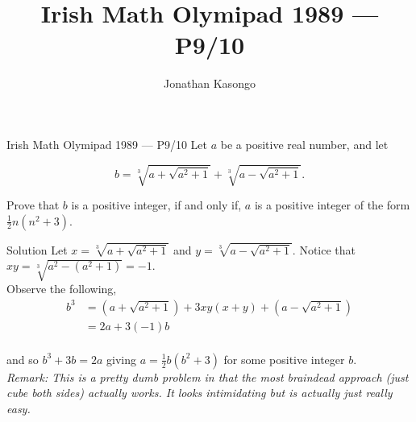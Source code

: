 \documentclass{article}
\author{Jonathan Kasongo}
\title{Irish Math Olymipad 1989 --- P9/10}
\begin{document}
\maketitle

\begin{problem}{Irish Math Olymipad 1989 --- P9/10}
Let $a$ be a positive real number, and let

$$
b = \sqrt[3]{a + \sqrt{a^2 + 1}} + \sqrt[3]{a - \sqrt{a^2 + 1}}.
$$

Prove that $b$ is a positive integer, if and only if, $a$ is a positive
integer of the form $\frac12 n(n^2 + 3)$.
\end{problem}

\begin{solution}{Solution}
Let $x = \sqrt[3]{a + \sqrt{a^2 + 1}}$ and
$y = \sqrt[3]{a - \sqrt{a^2 + 1}}$. Notice that
$xy = \sqrt[3]{a^2 - (a^2 + 1)} = -1$. \\

Observe the following,
\[
\begin{aligned}
b^3 &= \left(a + \sqrt{a^2 + 1}\right) + 3xy(x+y) + \left(a - \sqrt{a^2 + 1}\right) \\
&= 2a + 3(-1)b \\
\end{aligned}
\]

and so $b^3 + 3b = 2a$ giving $a = \frac12 b(b^2 + 3)$ for some
positive integer $b$.
\\

\textit{Remark: This is a pretty dumb problem in that the most braindead
approach (just cube both sides) actually works. It looks intimidating but
is actually just really easy.}
\end{solution}
\end{document}
